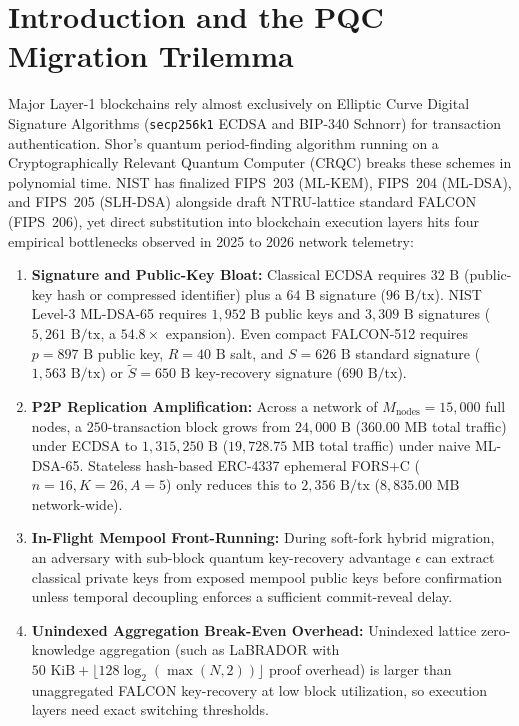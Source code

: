 \documentclass[conference,compsoc]{IEEEtran}
\begin{document}
\section{Introduction and the PQC Migration Trilemma}
\label{sec:intro}

Major Layer-1 blockchains rely almost exclusively on Elliptic Curve Digital Signature Algorithms (\texttt{secp256k1} ECDSA and BIP-340 Schnorr) for transaction authentication. Shor's quantum period-finding algorithm running on a Cryptographically Relevant Quantum Computer (CRQC) breaks these schemes in polynomial time. NIST has finalized FIPS~203 (ML-KEM), FIPS~204 (ML-DSA), and FIPS~205 (SLH-DSA) alongside draft NTRU-lattice standard FALCON (FIPS~206), yet direct substitution into blockchain execution layers hits four empirical bottlenecks observed in 2025 to 2026 network telemetry:
\begin{enumerate}
    \item \textbf{Signature and Public-Key Bloat:} Classical ECDSA requires $32\text{ B}$ (public-key hash or compressed identifier) plus a $64\text{ B}$ signature ($96\text{ B/tx}$). NIST Level-3 ML-DSA-65 requires $1{,}952\text{ B}$ public keys and $3{,}309\text{ B}$ signatures ($5{,}261\text{ B/tx}$, a $54.8\times$ expansion). Even compact FALCON-512 requires $p = 897\text{ B}$ public key, $R = 40\text{ B}$ salt, and $S = 626\text{ B}$ standard signature ($1{,}563\text{ B/tx}$) or $\tilde{S} = 650\text{ B}$ key-recovery signature ($690\text{ B/tx}$).
    \item \textbf{P2P Replication Amplification:} Across a network of $M_{\text{nodes}} = 15{,}000$ full nodes, a $250$-transaction block grows from $24{,}000\text{ B}$ ($360.00\text{ MB}$ total traffic) under ECDSA to $1{,}315{,}250\text{ B}$ ($19{,}728.75\text{ MB}$ total traffic) under naive ML-DSA-65. Stateless hash-based ERC-4337 ephemeral FORS+C ($n=16, K=26, A=5$) only reduces this to $2{,}356\text{ B/tx}$ ($8{,}835.00\text{ MB}$ network-wide).
    \item \textbf{In-Flight Mempool Front-Running:} During soft-fork hybrid migration, an adversary with sub-block quantum key-recovery advantage $\epsilon$ can extract classical private keys from exposed mempool public keys before confirmation unless temporal decoupling enforces a sufficient commit-reveal delay.
    \item \textbf{Unindexed Aggregation Break-Even Overhead:} Unindexed lattice zero-knowledge aggregation (such as LaBRADOR with $50\text{ KiB} + \lfloor 128 \log_2(\max(N,2))\rfloor$ proof overhead) is larger than unaggregated FALCON key-recovery at low block utilization, so execution layers need exact switching thresholds.
\end{enumerate}
\end{document}
